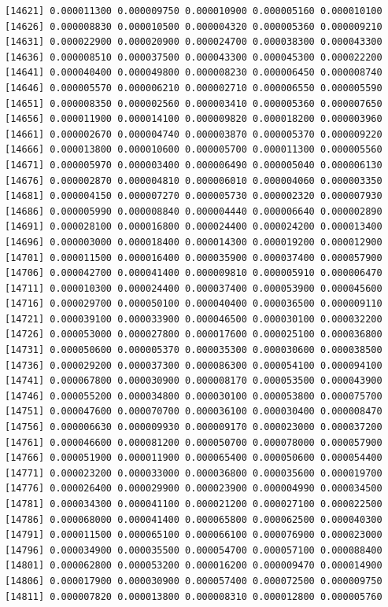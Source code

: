 \documentclass[]{article}
\begin{document}
\begin{verbatim}
[14621] 0.000011300 0.000009750 0.000010900 0.000005160 0.000010100
[14626] 0.000008830 0.000010500 0.000004320 0.000005360 0.000009210
[14631] 0.000022900 0.000020900 0.000024700 0.000038300 0.000043300
[14636] 0.000008510 0.000037500 0.000043300 0.000045300 0.000022200
[14641] 0.000040400 0.000049800 0.000008230 0.000006450 0.000008740
[14646] 0.000005570 0.000006210 0.000002710 0.000006550 0.000005590
[14651] 0.000008350 0.000002560 0.000003410 0.000005360 0.000007650
[14656] 0.000011900 0.000014100 0.000009820 0.000018200 0.000003960
[14661] 0.000002670 0.000004740 0.000003870 0.000005370 0.000009220
[14666] 0.000013800 0.000010600 0.000005700 0.000011300 0.000005560
[14671] 0.000005970 0.000003400 0.000006490 0.000005040 0.000006130
[14676] 0.000002870 0.000004810 0.000006010 0.000004060 0.000003350
[14681] 0.000004150 0.000007270 0.000005730 0.000002320 0.000007930
[14686] 0.000005990 0.000008840 0.000004440 0.000006640 0.000002890
[14691] 0.000028100 0.000016800 0.000024400 0.000024200 0.000013400
[14696] 0.000003000 0.000018400 0.000014300 0.000019200 0.000012900
[14701] 0.000011500 0.000016400 0.000035900 0.000037400 0.000057900
[14706] 0.000042700 0.000041400 0.000009810 0.000005910 0.000006470
[14711] 0.000010300 0.000024400 0.000037400 0.000053900 0.000045600
[14716] 0.000029700 0.000050100 0.000040400 0.000036500 0.000009110
[14721] 0.000039100 0.000033900 0.000046500 0.000030100 0.000032200
[14726] 0.000053000 0.000027800 0.000017600 0.000025100 0.000036800
[14731] 0.000050600 0.000005370 0.000035300 0.000030600 0.000038500
[14736] 0.000029200 0.000037300 0.000086300 0.000054100 0.000094100
[14741] 0.000067800 0.000030900 0.000008170 0.000053500 0.000043900
[14746] 0.000055200 0.000034800 0.000030100 0.000053800 0.000075700
[14751] 0.000047600 0.000070700 0.000036100 0.000030400 0.000008470
[14756] 0.000006630 0.000009930 0.000009170 0.000023000 0.000037200
[14761] 0.000046600 0.000081200 0.000050700 0.000078000 0.000057900
[14766] 0.000051900 0.000011900 0.000065400 0.000050600 0.000054400
[14771] 0.000023200 0.000033000 0.000036800 0.000035600 0.000019700
[14776] 0.000026400 0.000029900 0.000023900 0.000004990 0.000034500
[14781] 0.000034300 0.000041100 0.000021200 0.000027100 0.000022500
[14786] 0.000068000 0.000041400 0.000065800 0.000062500 0.000040300
[14791] 0.000011500 0.000065100 0.000066100 0.000076900 0.000023000
[14796] 0.000034900 0.000035500 0.000054700 0.000057100 0.000088400
[14801] 0.000062800 0.000053200 0.000016200 0.000009470 0.000014900
[14806] 0.000017900 0.000030900 0.000057400 0.000072500 0.000009750
[14811] 0.000007820 0.000013800 0.000008310 0.000012800 0.000005760

\end{verbatim}
\end{document}
